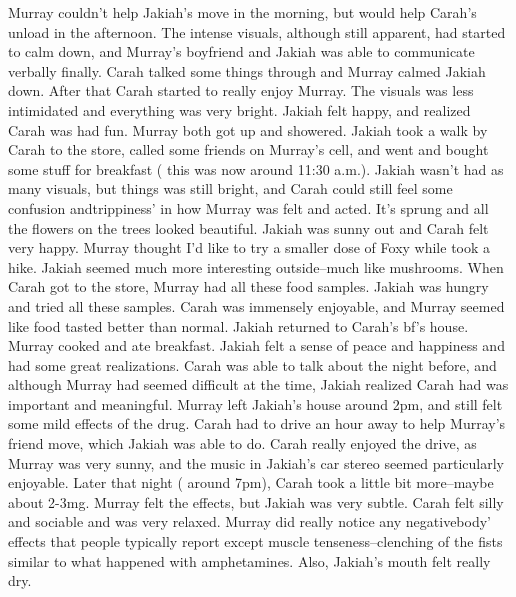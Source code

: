 \documentclass[12pt]{book}
\begin{document}
Murray couldn't help Jakiah's move in the morning, but would help Carah's unload in the afternoon. The intense visuals, although still apparent, had started to calm down, and Murray's boyfriend and Jakiah was able to communicate verbally finally. Carah talked some things through and Murray calmed Jakiah down. After that Carah started to really enjoy Murray. The visuals was less intimidated and everything was very bright. Jakiah felt happy, and realized Carah was had fun. Murray both got up and showered. Jakiah took a walk by Carah to the store, called some friends on Murray's cell, and went and bought some stuff for breakfast ( this was now around 11:30 a.m.). Jakiah wasn't had as many visuals, but things was still bright, and Carah could still feel some confusion andtrippiness' in how Murray was felt and acted. It's sprung and all the flowers on the trees looked beautiful. Jakiah was sunny out and Carah felt very happy. Murray thought I'd like to try a smaller dose of Foxy while took a hike. Jakiah seemed much more interesting outside--much like mushrooms. When Carah got to the store, Murray had all these food samples. Jakiah was hungry and tried all these samples. Carah was immensely enjoyable, and Murray seemed like food tasted better than normal. Jakiah returned to Carah's bf's house. Murray cooked and ate breakfast. Jakiah felt a sense of peace and happiness and had some great realizations. Carah was able to talk about the night before, and although Murray had seemed difficult at the time, Jakiah realized Carah had was important and meaningful. Murray left Jakiah's house around 2pm, and still felt some mild effects of the drug. Carah had to drive an hour away to help Murray's friend move, which Jakiah was able to do. Carah really enjoyed the drive, as Murray was very sunny, and the music in Jakiah's car stereo seemed particularly enjoyable. Later that night ( around 7pm), Carah took a little bit more--maybe about 2-3mg. Murray felt the effects, but Jakiah was very subtle. Carah felt silly and sociable and was very relaxed. Murray did really notice any negativebody' effects that people typically report except muscle tenseness--clenching of the fists similar to what happened with amphetamines. Also, Jakiah's mouth felt really dry.
\end{document}
